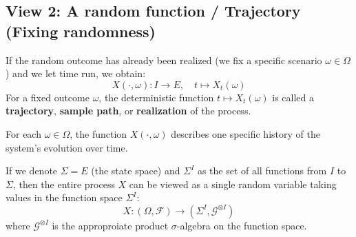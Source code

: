 \subsection{View 2: A random function / Trajectory (Fixing randomness)}
If the random outcome has already been realized (we fix a specific scenario $\omega \in \Omega$) and we let time run, we obtain:
\[
X(\cdot, \omega) : I \to E, \quad t \mapsto X_t(\omega)
\]
For a fixed outcome $\omega$, the deterministic function $t \mapsto X_t(\omega)$ is called a \textbf{trajectory}, \textbf{sample path}, or \textbf{realization} of the process.

\begin{definition}[Trajectory]
For each $\omega \in \Omega$, the function $X(\cdot, \omega)$ describes one specific history of the system's evolution over time.
\end{definition}

If we denote $\Sigma = E$ (the state space) and $\Sigma^I$ as the set of all functions from $I$ to $\Sigma$, then the entire process $X$ can be viewed as a single random variable taking values in the function space $\Sigma^I$:
\[
X: (\Omega, \mathcal{F}) \to (\Sigma^I, \mathcal{G}^{\otimes I})
\]
where $\mathcal{G}^{\otimes I}$ is the approproiate product $\sigma$-algebra on the function space.
